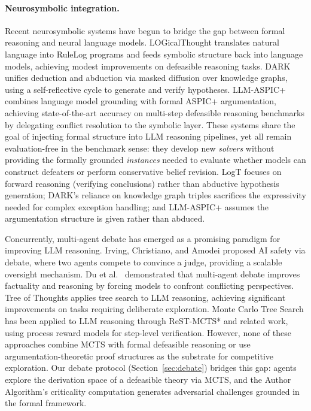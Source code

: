 \documentclass{article}
\theoremstyle{definition}
\begin{document}
\paragraph{Neurosymbolic integration.} Recent neurosymbolic systems have begun to bridge the gap between formal reasoning and neural language models. LOGicalThought \cite{nananukul2025logicalt} translates natural language into RuleLog programs and feeds symbolic structure back into language models, achieving modest improvements on defeasible reasoning tasks. DARK \cite{gao2025dark} unifies deduction and abduction via masked diffusion over knowledge graphs, using a self-reflective cycle to generate and verify hypotheses. LLM-ASPIC+ \cite{fang2025llmaspic} combines language model grounding with formal ASPIC+ argumentation, achieving state-of-the-art accuracy on multi-step defeasible reasoning benchmarks by delegating conflict resolution to the symbolic layer. These systems share the goal of injecting formal structure into LLM reasoning pipelines, yet all remain evaluation-free in the benchmark sense: they develop new \emph{solvers} without providing the formally grounded \emph{instances} needed to evaluate whether models can construct defeaters or perform conservative belief revision. LogT focuses on forward reasoning (verifying conclusions) rather than abductive hypothesis generation; DARK's reliance on knowledge graph triples sacrifices the expressivity needed for complex exception handling; and LLM-ASPIC+ assumes the argumentation structure is given rather than abduced.

Concurrently, multi-agent debate has emerged as a promising paradigm for improving LLM reasoning. Irving, Christiano, and Amodei \cite{irving2018ai_safety_debate} proposed AI safety via debate, where two agents compete to convince a judge, providing a scalable oversight mechanism. Du et al.\ \cite{du2023debate} demonstrated that multi-agent debate improves factuality and reasoning by forcing models to confront conflicting perspectives. Tree of Thoughts \cite{yao2024tree_of_thoughts} applies tree search to LLM reasoning, achieving significant improvements on tasks requiring deliberate exploration. Monte Carlo Tree Search has been applied to LLM reasoning through ReST-MCTS* and related work, using process reward models for step-level verification. However, none of these approaches combine MCTS with formal defeasible reasoning or use argumentation-theoretic proof structures as the substrate for competitive exploration. Our debate protocol (Section~\ref{sec:debate}) bridges this gap: agents explore the derivation space of a defeasible theory via MCTS, and the Author Algorithm's criticality computation generates adversarial challenges grounded in the formal framework.
\end{document}
